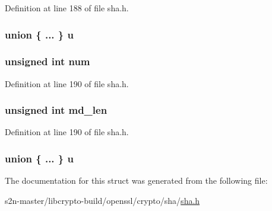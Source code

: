 Definition at line 188 of file sha.\+h.

\subsubsection[{\texorpdfstring{u}{u}}]{\setlength{\rightskip}{0pt plus 5cm}union \{ ... \}   u}\hypertarget{struct_s_h_a512state__st_adaa1bccc983949f08b5e6cd788c28185}{}\label{struct_s_h_a512state__st_adaa1bccc983949f08b5e6cd788c28185}
\subsubsection[{\texorpdfstring{num}{num}}]{\setlength{\rightskip}{0pt plus 5cm}unsigned int num}\hypertarget{struct_s_h_a512state__st_a41ddefd3473727cad32a9767c10faed8}{}\label{struct_s_h_a512state__st_a41ddefd3473727cad32a9767c10faed8}


Definition at line 190 of file sha.\+h.

\subsubsection[{\texorpdfstring{md\+\_\+len}{md_len}}]{\setlength{\rightskip}{0pt plus 5cm}unsigned int md\+\_\+len}\hypertarget{struct_s_h_a512state__st_a0d87e60065bbf0161a8587c011168d6c}{}\label{struct_s_h_a512state__st_a0d87e60065bbf0161a8587c011168d6c}


Definition at line 190 of file sha.\+h.

\subsubsection[{\texorpdfstring{u}{u}}]{\setlength{\rightskip}{0pt plus 5cm}union \{ ... \}   u}\hypertarget{struct_s_h_a512state__st_ae109df267f21a0a94cfd491120d25f2d}{}\label{struct_s_h_a512state__st_ae109df267f21a0a94cfd491120d25f2d}


The documentation for this struct was generated from the following file\+:\begin{DoxyCompactItemize}
\item 
s2n-\/master/libcrypto-\/build/openssl/crypto/sha/\hyperlink{crypto_2sha_2sha_8h}{sha.\+h}\end{DoxyCompactItemize}
